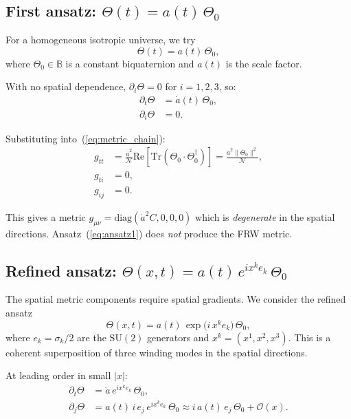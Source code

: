 \documentclass[12pt,a4paper]{article}
\begin{document}
\subsection{First ansatz: $\Theta(t) = a(t)\,\Theta_0$}

For a homogeneous isotropic universe, we try
\begin{equation}
  \label{eq:ansatz1}
  \Theta(t) = a(t)\,\Theta_0,
\end{equation}
where $\Theta_0\in\mathbb{B}$ is a constant biquaternion and
$a(t)$ is the scale factor.

With no spatial dependence, $\partial_i\Theta = 0$ for $i=1,2,3$, so:
\begin{align}
  \partial_t\Theta &= \dot a(t)\,\Theta_0, \\
  \partial_i\Theta &= 0.
\end{align}

Substituting into~(\ref{eq:metric_chain}):
\begin{align}
  g_{tt} &= \frac{\dot a^2}{\mathcal{N}}
             \mathrm{Re}[\mathrm{Tr}(\Theta_0\cdot\Theta_0^\dagger)]
           = \frac{\dot a^2 \|\Theta_0\|^2}{\mathcal{N}}, \\
  g_{ti} &= 0, \\
  g_{ij} &= 0.
\end{align}

This gives a metric $g_{\mu\nu} = \mathrm{diag}(\dot a^2 C, 0, 0, 0)$
which is \emph{degenerate} in the spatial directions.
Ansatz~(\ref{eq:ansatz1}) does \emph{not} produce the FRW metric.

\subsection{Refined ansatz: $\Theta(x,t) = a(t)\,e^{ix^k e_k}\,\Theta_0$}

The spatial metric components require spatial gradients.
We consider the refined ansatz
\begin{equation}
  \label{eq:ansatz2}
  \Theta(x,t) = a(t)\,\exp\!\bigl(i\,x^k e_k\bigr)\,\Theta_0,
\end{equation}
where $e_k = \sigma_k/2$ are the $\mathrm{SU}(2)$ generators
and $x^k = (x^1, x^2, x^3)$.
This is a coherent superposition of three winding modes in the spatial directions.

At leading order in small $|x|$:
\begin{align}
  \partial_t\Theta &= \dot a\,e^{ix^k e_k}\,\Theta_0, \\
  \partial_j\Theta &= a(t)\,i\,e_j\,e^{ix^k e_k}\,\Theta_0
  \approx i\,a(t)\,e_j\,\Theta_0 + \mathcal{O}(x).
\end{align}
\end{document}
